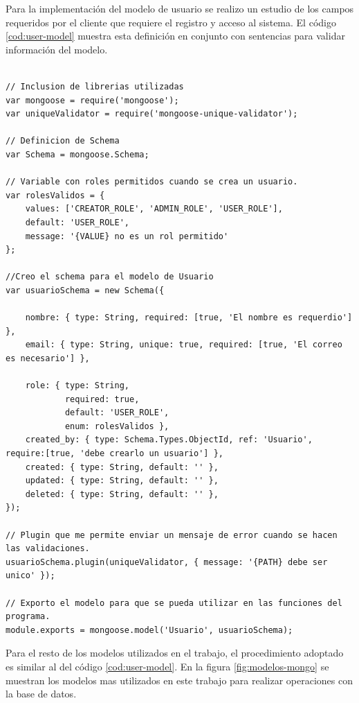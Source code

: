 Para la implementación del modelo de usuario se realizo un estudio de los campos requeridos por el cliente que requiere el registro y acceso al sistema. El código  \ref{cod:user-model}  muestra esta definición en conjunto con sentencias para validar información del modelo.

\begin{lstlisting}[label=cod:user-model,caption=Definición de Schema para el modelo de usuario.] 

// Inclusion de librerias utilizadas
var mongoose = require('mongoose');
var uniqueValidator = require('mongoose-unique-validator');

// Definicion de Schema
var Schema = mongoose.Schema;

// Variable con roles permitidos cuando se crea un usuario.
var rolesValidos = {
    values: ['CREATOR_ROLE', 'ADMIN_ROLE', 'USER_ROLE'],
    default: 'USER_ROLE',
    message: '{VALUE} no es un rol permitido'
};

//Creo el schema para el modelo de Usuario
var usuarioSchema = new Schema({

    nombre: { type: String, required: [true, 'El nombre es requerdio'] },
    email: { type: String, unique: true, required: [true, 'El correo es necesario'] },
    
    role: { type: String, 
            required: true, 
            default: 'USER_ROLE', 
            enum: rolesValidos },
    created_by: { type: Schema.Types.ObjectId, ref: 'Usuario', require:[true, 'debe crearlo un usuario'] },
    created: { type: String, default: '' },
    updated: { type: String, default: '' },
    deleted: { type: String, default: '' },
});

// Plugin que me permite enviar un mensaje de error cuando se hacen las validaciones.
usuarioSchema.plugin(uniqueValidator, { message: '{PATH} debe ser unico' });

// Exporto el modelo para que se pueda utilizar en las funciones del programa.
module.exports = mongoose.model('Usuario', usuarioSchema);

\end{lstlisting}

Para el resto de los modelos utilizados en el trabajo, el procedimiento adoptado es similar al del código \ref{cod:user-model}. En la figura \ref{fig:modelos-mongo} se muestran los modelos mas utilizados en este trabajo para realizar operaciones con la base de datos. 

